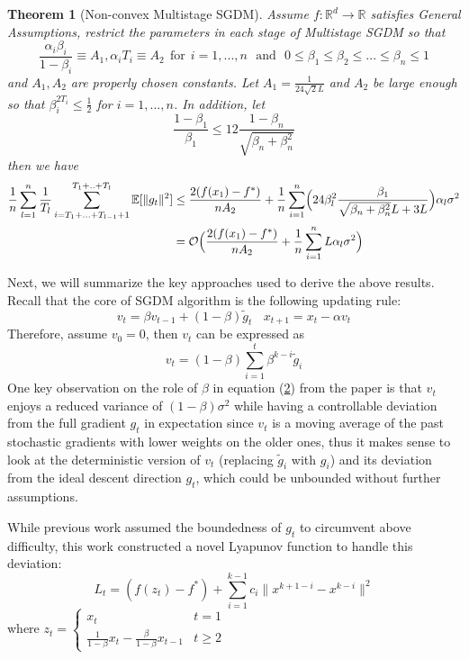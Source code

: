 \documentclass{article}
\newtheorem{theorem}{Theorem}[section]
\begin{document}
\begin{theorem}[Non-convex Multistage SGDM]
	\label{theom43} Assume $f:\mathbb{R}^d \rightarrow \mathbb{R}$ satisfies General Assumptions, restrict the parameters in each stage of Multistage SGDM so that 
\begin{equation}
\label{eq41}
\frac{\alpha_i\beta_i}{1 - \beta_i} \equiv A_1, \alpha_iT_i \equiv A_2 \ \ \text{for}  \ \ i = 1,...,n \ \ \ \text{and} \ \ \
0 \leq \beta_1 \leq \beta_2 \leq ... \leq \beta_n \leq 1
\end{equation}
and $A_1, A_2$ are properly chosen constants. Let $A_1 = \frac{1}{24\sqrt{2}L}$ and $A_2$ be large enough so that $\beta_i^{2T_i} \leq \frac{1}{2}$ for $i = 1,...,n$. In addition, let
\[
\frac{1 - \beta_1}{\beta_1} \leq 12 \frac{1 - \beta_n}{\sqrt{\beta_n + \beta_n^2}}
\] then we have
\[
\begin{split}
\frac{1}{n}\sum_{l = 1}^{n}\frac{1}{T_l}\sum_{i = T_1 + ... + T_{l - 1} + 1}^{T_1 + .. + T_l}\mathbb{E}[\|g_t\|^2] &\leq \frac{2(f(x_1) - f^*)}{nA_2} + \frac{1}{n}\sum_{i = 1}^n\Bigl(24\beta^2_l\frac{\beta_1}{\sqrt{\beta_n + \beta_n^2}L + 3L}\Bigr)\alpha_l\sigma^2\\
&= \mathcal{O}\Bigl(\frac{2(f(x_1) - f^*)}{nA_2} + \frac{1}{n}\sum_{i = 1}^nL\alpha_l\sigma^2\Bigr)
\end{split}
\]
\end{theorem}
Next, we will summarize the key approaches used to derive the above results. Recall that the core of SGDM algorithm is the following updating rule:
\[
v_t = \beta v_{t - 1} + (1 - \beta)\tilde{g}_t \ \ \ \
x_{t + 1} = x_t - \alpha v_t
\]
Therefore, assume $v_0 = 0$, then $v_t$ can be expressed as 
\begin{equation}
\label{eq42}
v_t = (1 - \beta)\sum_{i = 1}^{t}\beta^{k - i}\tilde{g}_i
\end{equation}
One key observation on the role of $\beta$ in equation (\hyperref[eq42]{2}) from the paper is that $v_t$ enjoys a reduced variance of $(1 - \beta)\sigma^2$ while having a controllable deviation from the full gradient $g_t$ in expectation since $v_t$ is a moving average of the past stochastic gradients with lower weights on the older ones, thus it makes sense to look at the deterministic version of $v_t$ (replacing $\tilde{g}_i$ with $g_i$) and its deviation from the ideal descent direction $g_t$, which could be unbounded without further assumptions.

While previous work assumed the boundedness of $g_t$ to circumvent above difficulty, this work constructed a novel Lyapunov function to handle this deviation:
\[
L_t = (f(z_t) - f^*) + \sum_{i = 1}^{k - 1}c_i\|x^{k + 1 - i} - x^{k - i}\|^2
\]
where $z_t = \begin{cases}
	x_t & t = 1 \\
	\frac{1}{1 - \beta}x_t - \frac{\beta}{1 - \beta}x_{t - 1} & t \geq 2
\end{cases}$\\
\end{document}
